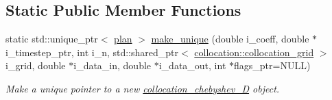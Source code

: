 \subsection*{Static Public Member Functions}
\begin{DoxyCompactItemize}
\item 
static std\-::unique\-\_\-ptr$<$ \hyperlink{classplan}{plan} $>$ \hyperlink{classdiffusion_1_1explicit__methods_1_1collocation__chebyshev__1_d_aeaf94cfc47834d1b93cdd3396a8ce4a9}{make\-\_\-unique} (double i\-\_\-coeff, double $\ast$i\-\_\-timestep\-\_\-ptr, int i\-\_\-n, std\-::shared\-\_\-ptr$<$ \hyperlink{classcollocation_1_1collocation__grid}{collocation\-::collocation\-\_\-grid} $>$ i\-\_\-grid, double $\ast$i\-\_\-data\-\_\-in, double $\ast$i\-\_\-data\-\_\-out, int $\ast$flags\-\_\-ptr=N\-U\-L\-L)
\begin{DoxyCompactList}\small\item\em Make a unique pointer to a new \hyperlink{classdiffusion_1_1explicit__methods_1_1collocation__chebyshev__1_d}{collocation\-\_\-chebyshev\-\_\-D} object. \end{DoxyCompactList}\end{DoxyCompactItemize}
